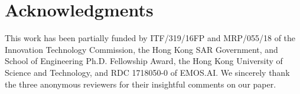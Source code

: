 \documentclass[11pt,a4paper]{article}
\begin{document}
\section*{Acknowledgments}
This work has been partially funded by ITF/319/16FP and MRP/055/18 of the Innovation Technology Commission, the Hong Kong SAR Government, and School of Engineering Ph.D. Fellowship Award, the Hong Kong University of Science and Technology, and RDC 1718050-0 of EMOS.AI. We sincerely thank the three anonymous reviewers for their insightful comments on our paper.



\end{document}
